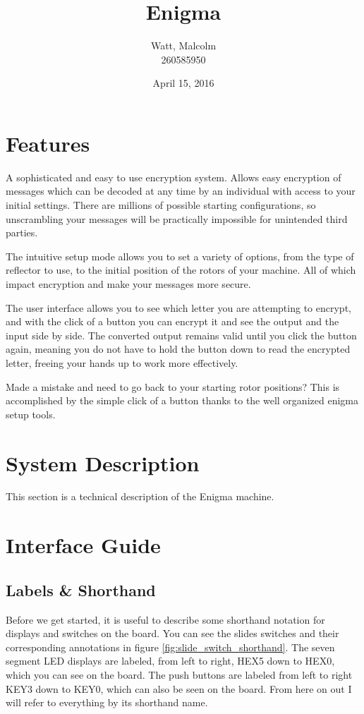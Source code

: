 \documentclass{article}
\title{\Huge{Enigma}}
\author{
    Watt, Malcolm \\
    260585950
}
\date{April 15, 2016}
\begin{document}
\maketitle

\section{Features}
A sophisticated and easy to use encryption system. Allows easy encryption of messages which can be decoded at any time by an individual with access to your initial settings. There are millions of possible starting configurations, so unscrambling your messages will be practically impossible for unintended third parties. 

The intuitive setup mode allows you to set a variety of options, from the type of reflector to use, to the initial position of the rotors of your machine. All of which impact encryption and make your messages more secure. 

The user interface allows you to see which letter you are attempting to encrypt, and with the click of a button you can encrypt it and see the output and the input side by side. The converted output remains valid until you click the button again, meaning you do not have to hold the button down to read the encrypted letter, freeing your hands up to work more effectively. 

Made a mistake and need to go back to your starting rotor positions? This is accomplished by the simple click of a button thanks to the well organized enigma setup tools. 


\section{System Description}
This section is a technical description of the Enigma machine. 


\section{Interface Guide}

\subsection{Labels \& Shorthand}
Before we get started, it is useful to describe some shorthand notation for displays and switches on the board. You can see the slides switches and their corresponding annotations in figure \ref{fig:slide_switch_shorthand}. The seven segment LED displays are labeled, from left to right, HEX5 down to HEX0, which you can see on the board. The push buttons are labeled from left to right KEY3 down to KEY0, which can also be seen on the board. From here on out I will refer to everything by its shorthand name. 
\end{document}
